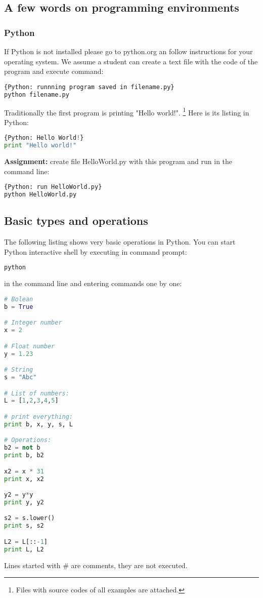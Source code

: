 \subsection{A few words on programming environments}
\subsubsection{Python}
If Python is not installed please go to python.org an follow
instructions for your operating system.
We assume a student can create a text file with the code of the program
and execute command:

\begin{lstlisting}[language=bash,style=codelst]{Python: runnning program saved in filename.py}
python filename.py
\end{lstlisting}

Traditionally the first program is printing "Hello world!".
\footnote{Files with source codes of all examples are attached.}
Here is its listing in Python:

\begin{lstlisting}[style=codelst, language=Python]{Python: Hello World!}
print "Hello world!"
\end{lstlisting}

\bigskip
\begin{tcolorbox}
\textbf{Assignment:} create file HelloWorld.py with this program
and run in the command line:
\begin{lstlisting}[language=bash,frame=single]{Python: run HelloWorld.py}
python HelloWorld.py
\end{lstlisting}
\end{tcolorbox}

\subsection{Basic types and operations}

The following listing shows very basic operations
in Python. You can start Python interactive shell by executing
in command prompt:
\begin{lstlisting}[language=bash,style=codelst]
python
\end{lstlisting}
in the command line and entering commands one by one:

\begin{lstlisting}[style=codelst,language=Python]
# Bolean
b = True

# Integer number
x = 2

# Float number
y = 1.23

# String
s = "Abc"

# List of numbers:
L = [1,2,3,4,5]

# print everything:
print b, x, y, s, L

# Operations:
b2 = not b
print b, b2

x2 = x * 31
print x, x2

y2 = y*y
print y, y2

s2 = s.lower()
print s, s2

L2 = L[::-1]
print L, L2
\end{lstlisting}
Lines started with \# are comments, they are not executed.

